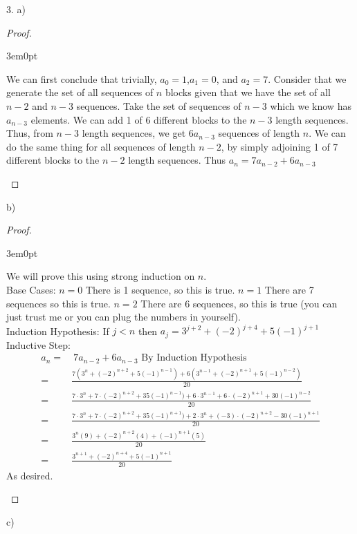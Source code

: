\documentclass[11pt]{article}
\newenvironment{myproof}
{\begin{proof} \begin{adjustwidth}{3em}{0pt}$ $\par\nobreak\ignorespaces}
{\end{adjustwidth} \end{proof}}
\begin{document}
\begin{flushleft}
\newpage

3. a)

\begin{myproof}
We can first conclude that trivially, $a_0 = 1$,$a_1 = 0$, and $a_2 = 7$. Consider that we generate the set of all sequences of $n$ blocks given that we have the set of all $n-2$ and $n-3$ sequences. Take the set of sequences of $n-3$ which we know has $a_{n-3}$ elements. We can add 1 of 6 different blocks to the $n-3$ length sequences. Thus, from $n-3$ length sequences, we get $6 a_{n-3}$ sequences of length $n$. We can do the same thing for all sequences of length $n-2$, by simply adjoining 1 of 7 different blocks to the $n-2$ length sequences. Thus $a_n = 7 a_{n-2} + 6 a_{n-3}$
\end{myproof}

b)

\begin{myproof}
We will prove this using strong induction on $n$. \\
\bigskip
Base Cases: $n = 0$ There is 1 sequence, so this is true. $n = 1$ There are 7 sequences so this is true. $n=2$ There are 6 sequences, so this is true (you can just trust me or you can plug the numbers in yourself). \\
Induction Hypothesis: If $j < n$ then $a_j = 3^{j+2} + (-2)^{j+4} + 5(-1)^{j+1}$ \\
Inductive Step:
\begin{align*}
a_n = & \ 7a_{n-2} + 6a_{n-3} \text{ By Induction Hypothesis} \ \\
= & \frac{7(3^{n} + (-2)^{n+2} + 5(-1)^{n-1})+6(3^{n-1} + (-2)^{n+1} + 5(-1)^{n-2})}{20}  \\
= & \frac{7 \cdot 3^{n} + 7 \cdot (-2)^{n+2} + 35(-1)^{n-1})+6 \cdot 3^{n-1} + 6 \cdot (-2)^{n+1} + 30(-1)^{n-2}}{20} \\
= & \frac{7 \cdot 3^{n} + 7 \cdot (-2)^{n+2} + 35(-1)^{n+1})+2 \cdot 3^{n} + (-3) \cdot (-2)^{n+2}  -30(-1)^{n+1}}{20} \\
= & \frac{3^n(9)+(-2)^{n+2}(4)+(-1)^{n+1}(5)}{20} \\
= & \frac{3^{n+1}+(-2)^{n+4}+5(-1)^{n+1}}{20}
\end{align*}
As desired.
\end{myproof}

c)


\end{flushleft}
\end{document}
